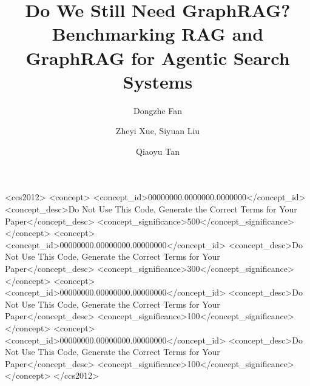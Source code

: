 \documentclass[sigconf]{acmart}
\begin{document}
\title{Do We Still Need GraphRAG? Benchmarking RAG and GraphRAG for Agentic Search Systems}


\author{Dongzhe Fan}

\author{Zheyi Xue, Siyuan Liu}

\author{Qiaoyu Tan}

\renewcommand{\shortauthors}{Trovato et al.}

\begin{abstract}

\end{abstract}

\begin{CCSXML}
<ccs2012>
 <concept>
  <concept_id>00000000.0000000.0000000</concept_id>
  <concept_desc>Do Not Use This Code, Generate the Correct Terms for Your Paper</concept_desc>
  <concept_significance>500</concept_significance>
 </concept>
 <concept>
  <concept_id>00000000.00000000.00000000</concept_id>
  <concept_desc>Do Not Use This Code, Generate the Correct Terms for Your Paper</concept_desc>
  <concept_significance>300</concept_significance>
 </concept>
 <concept>
  <concept_id>00000000.00000000.00000000</concept_id>
  <concept_desc>Do Not Use This Code, Generate the Correct Terms for Your Paper</concept_desc>
  <concept_significance>100</concept_significance>
 </concept>
 <concept>
  <concept_id>00000000.00000000.00000000</concept_id>
  <concept_desc>Do Not Use This Code, Generate the Correct Terms for Your Paper</concept_desc>
  <concept_significance>100</concept_significance>
 </concept>
</ccs2012>
\end{CCSXML}
\end{document}
